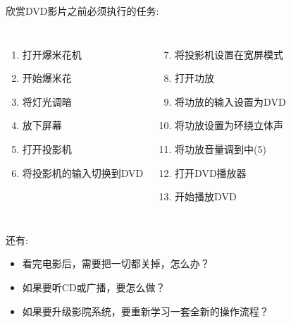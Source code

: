 \documentclass[compress]{beamer}
\begin{document}
{\begin{frame}
{{
}
}

 {
欣赏DVD影片之前必须执行的任务: \\[-3ex]
\begin{columns}[t]
\column{0.5\hsize}

\begin{enumerate}
\item 打开爆米花机
\item 开始爆米花
\item 将灯光调暗
\item 放下屏幕
\item 打开投影机
\item 将投影机的输入切换到DVD
\end{enumerate}

\column{0.5\hsize}
\begin{enumerate}
\setcounter{enumi}{6}
\item 将投影机设置在宽屏模式
\item 打开功放
\item 将功放的输入设置为DVD
\item 将功放设置为环绕立体声
\item 将功放音量调到中(5)
\item 打开DVD播放器
\item 开始播放DVD
\end{enumerate}
\end{columns}
}

 {
\vspace*{1ex}
\verbbeforewatchdvd
}

 {
还有:
\begin{itemize}
\item 看完电影后，需要把一切都关掉，怎么办？
\item 如果要听CD或广播，要怎么做？
\item 如果要升级影院系统，要重新学习一套全新的操作流程？
\end{itemize}
}

 {
\vspace*{4ex}
}

\end{frame}
}
\end{document}
